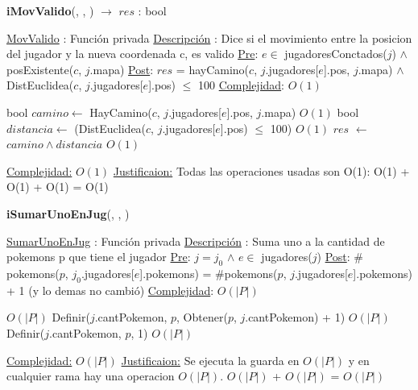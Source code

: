 \begin{Algoritmos}
\begin{algorithm}[H]
\begin{algorithmic}[1]
\end{algorithmic}
\end{algorithm}  
  


\begin{algorithm}[H]
{\textbf{iMovValido}(, , ) $\to$ $res$ : bool}
\begin{algorithmic}[1]

\Statex \underline{MovValido} : Funci\'on privada 
\Statex \underline{Descripci\'on} : Dice si el movimiento entre la posicion del jugador y la nueva coordenada c, es valido 
\Statex \underline{Pre}: $e \in$ jugadoresConctados($j$) $\land$ posExistente($c$, $j$.mapa) 
\Statex \underline{Post}: $res$ = hayCamino($c$, $j$.jugadores[$e$].pos, $j$.mapa) $\land$ 
\Statex $ $\hspace*{2cm} DistEuclidea($c$, $j$.jugadores[$e$].pos) $\leq$ 100
\Statex \underline{Complejidad}: $O(1)$ 

\State bool $camino \gets$ HayCamino($c$, $j$.jugadores[$e$].pos, $j$.mapa) \Comment $O(1)$
\State bool $distancia \gets$ (DistEuclidea($c$, $j$.jugadores[$e$].pos) $\leq$ 100) \Comment $O(1)$
\State $res$ $\gets$ $camino \land distancia$ \Comment $O(1)$

\medskip
\Statex \underline{Complejidad:} $O(1)$
\Statex \underline{Justificaion:} Todas las operaciones usadas son O(1): O(1) + O(1) + O(1) = O(1)

\end{algorithmic}
\end{algorithm}  
  


\begin{algorithm}[H]
{\textbf{iSumarUnoEnJug}(, , )}
\begin{algorithmic}[1]

\Statex \underline{SumarUnoEnJug} : Funci\'on privada 
\Statex \underline{Descripci\'on} : Suma uno a la cantidad de pokemons p que tiene el jugador 
\Statex \underline{Pre}: $j = j_0$ $\land$  $e \in$ jugadores($j$)
\Statex \underline{Post}: $\#$pokemons($p$, $j_0$.jugadores[$e$].pokemons) = $\#$pokemons($p$, $j$.jugadores[$e$].pokemons) + 1 (y lo demas no cambi\'o)
\Statex \underline{Complejidad}: $O(|P|)$ 

 \Comment $O(|P|)$
  \State Definir($j$.cantPokemon, $p$, Obtener($p$, $j$.cantPokemon) + 1) \Comment $O(|P|)$
\Else
  \State Definir($j$.cantPokemon, $p$, 1)  \Comment $O(|P|)$
\EndIf


\medskip
\Statex \underline{Complejidad:} $O(|P|)$
\Statex \underline{Justificaion:} Se ejecuta la guarda en $O(|P|)$ y en cualquier rama hay una operacion $O(|P|)$. $O(|P|)$ + $O(|P|)$ = $O(|P|)$

\end{algorithmic}
\end{algorithm}  
  



\end{Algoritmos}